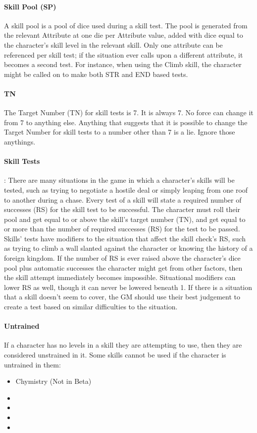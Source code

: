 \documentclass[oneside,11pt,english]{book}
\begin{document}
\paragraph{\label{par:Skill Pool}Skill Pool (SP)} A skill pool is a pool of dice used during a skill test. The pool is generated from the relevant Attribute at one die per Attribute value, added with dice equal to the character’s skill level in the relevant skill. Only one attribute can be referenced per skill test; if the situation ever calls upon a different attribute, it becomes a second test. For instance, when using the Climb skill, the character might be called on to make both STR and END based tests.
\paragraph{\label{par:TN}TN} The Target Number (TN) for skill tests is 7. It is always 7. No force can change it from 7 to anything else. Anything that suggests that it is possible to change the Target Number for skill tests to a number other than 7 is a lie. Ignore those anythings.
\paragraph{\label{par:Skill Tests}Skill Tests}: There are many situations in the game in which a character’s skills will be tested, such as trying to negotiate a hostile deal or simply leaping from one roof to another during a chase. Every test of a skill will state a required number of successes (RS) for the skill test to be successful. The character must roll their pool and get equal to or above the skill’s target number (TN), and get equal to or more than the number of required successes (RS) for the test to be passed. Skills’ tests have modifiers to the situation that affect the skill check’s RS, such as trying to climb a wall slanted against the character or knowing the history of a foreign kingdom. If the number of RS is ever raised above the character’s dice pool plus automatic successes the character might get from other factors, then the skill attempt immediately becomes impossible. Situational modifiers can lower RS as well, though it can never be lowered beneath 1. If there is a situation that a skill doesn’t seem to cover, the GM should use their best judgement to create a test based on similar difficulties to the situation.
\paragraph{\label{par:Untrained}Untrained} If a character has no levels in a skill they are attempting to use, then they are considered unstrained in it. Some skills cannot be used if the character is untrained in them:
\begin{itemize}
	\item Chymistry (Not in Beta)
	\item {}
	\item {}
	\item {}
	\item {}
\end{itemize}
\end{document}
